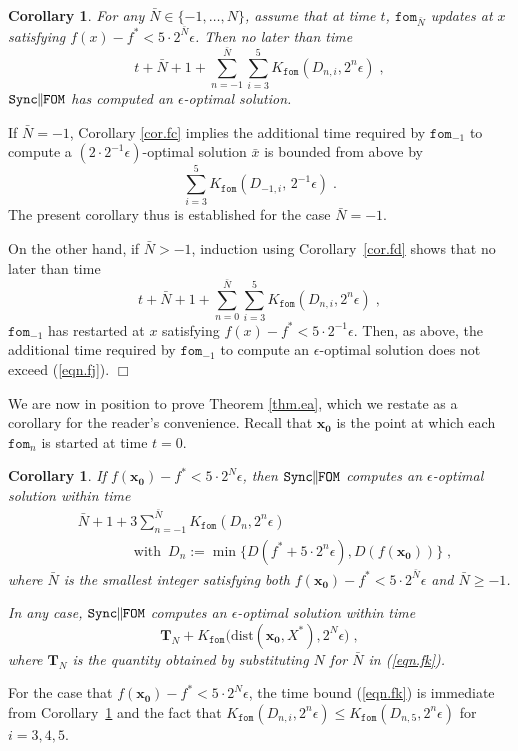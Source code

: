 \documentclass[reqno, 11pt]{amsart}
\newtheorem{cor}[prop]{Corollary}
\numberwithin{equation}{section}
\newcommand{\nt}{\negthinspace}
\newcommand{\fom}{\mathtt{fom}}
\newcommand{\parfom}{\parallel \nt \nt  \mathtt{FOM}}
\newcommand{\sparfom}{\mathtt{Sync} \nt \nt  \parfom}
\newcommand{\dist}{\mathrm{dist}}
\begin{document}
\begin{cor}  \label{cor.fe} 
For any $ \bar{N} \in \{ -1, \ldots, N \} $, assume that at time $ t $, $ \fom_{\bar{N}} $ updates at $ x $ satisfying $ f(x) - f^* < 5 \cdot 2^{\bar{N}}  \epsilon $. Then no later than time
\[  
     t + \bar{N}+1 + \sum_{n = -1}^{\bar{N}} \sum_{i=3}^5 K_{\fom}(D_{n,i}, 2^n \epsilon ) \; , 
\] 
$ \sparfom $ has computed an $ \epsilon $-optimal solution.
\end{cor}
  If $ \bar{N} = -1 $, Corollary \ref{cor.fc} implies the additional time required by $ \fom_{-1} $ to compute a $ (2 \cdot 2^{-1} \epsilon)  $-optimal solution $ \bar{x} $  is bounded from above by
\begin{equation}  \label{eqn.fj} 
      \sum_{i=3}^5 K_{\fom}( D_{-1,i}, \,  2^{-1} \epsilon ) \; . 
      \end{equation} 
The present corollary thus is established for the case $ \bar{N} = -1 $.

On the other hand, if $ \bar{N} > - 1 $, induction using Corollary~\ref{cor.fd}  shows that no later than time
\[  
   t +  \bar{N}+1  + \sum_{n=0}^{\bar{N}} \sum_{i=3}^5 K_{\fom}( D_{n,i}, 2^n \epsilon ) \; , 
\] 
$ \fom_{-1} $ has restarted at $ x $ satisfying $ f(x) - f^* < 5 \cdot 2^{-1} \epsilon $. Then, as above, the additional time required by $ \fom_{-1} $ to compute an $ \epsilon $-optimal solution does not exceed (\ref{eqn.fj}).   \hfill $ \Box $
\vspace{2mm}

We are now in position to prove Theorem \ref{thm.ea}, which we restate as a corollary for the reader's convenience.  Recall that $ \mathbf{x_0} $ is the point at which each $ \fom_n $ is started at time $ t = 0 $. 

\begin{cor}  \label{cor.ff} 
If $ f(\mathbf{x_0}) - f^* < 5 \cdot 2^N \epsilon $, then $ \sparfom $ computes an $ \epsilon $-optimal solution within time
\begin{align} 
  & \bar{N}+ 1 +  3 \sum_{n=-1}^{\bar{N}}  K_{\fom}\left(   D_n , 2^n \epsilon \right)  \label{eqn.fk}   \\   
& \qquad \qquad   \textrm{with } \,    D_n :=   \min \{ D(f^* + 5 \cdot 2^n \epsilon), D( f( \mathbf{x_0})) \}  \; , \nonumber 
\end{align}   
where $ \bar{N} $ is the smallest integer satisfying both $ f(\mathbf{x_0}) - f^* < 5 \cdot 2^{\bar{N}} \epsilon $ and $ \bar{N} \geq -1 $.

In any case, $ \sparfom $ computes an $ \epsilon $-optimal solution within time
\[ 
\mathbf{T}_N + 
  K_{\fom}\big( \dist( \mathbf{x_0}, X^*), 2^{N} \epsilon \big)   \; , 
\]  
 where $ \mathbf{T}_N  $ is the quantity obtained by substituting $ N $ for $ \bar{N} $ in (\ref{eqn.fk}).
\end{cor}
   For the case that $ f( \mathbf{x_0}) - f^* < 5 \cdot 2^{N} \epsilon $, the time bound (\ref{eqn.fk})  is immediate from Corollary~\ref{cor.fe}  and the fact that $ K_{\fom}(D_{n,i}, 2^n \epsilon ) \leq  K_{\fom}(D_{n,5}, 2^n \epsilon )  $ for $ i = 3,4,5 $.   
\end{document}
